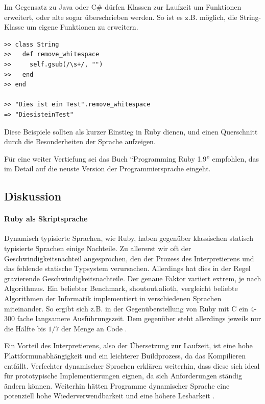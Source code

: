 Im Gegensatz zu Java oder C\# dürfen Klassen zur Laufzeit um Funktionen erweitert, oder alte sogar überschrieben werden. So ist es z.B. möglich, die String-Klasse um eigene Funktionen zu erweitern.

\begin{lstlisting}
>> class String
>>   def remove_whitespace
>>     self.gsub(/\s+/, "")
>>   end
>> end

>> "Dies ist ein Test".remove_whitespace
=> "DiesisteinTest"

\end{lstlisting}

Diese Beispiele sollten als kurzer Einstieg in Ruby dienen, und einen Querschnitt durch die Besonderheiten der Sprache aufzeigen.

Für eine weiter Vertiefung sei das Buch "`Programming Ruby 1.9"' empfohlen, das im Detail auf die neuste Version der Programmiersprache eingeht.

\subsection{Diskussion}

\paragraph{Ruby als Skriptsprache}
Dynamisch typisierte Sprachen, wie Ruby, haben gegenüber klassischen statisch typisierte Sprachen einige Nachteile. Zu allererst wir oft der Geschwindigkeitsnachteil angesprochen, den der Prozess des Interpretierens und das fehlende statische Typsystem verursachen.
Allerdings hat dies in der Regel gravierende Geschwindigkeitsnachteile. Der genaue Faktor variiert extrem, je nach Algorithmus. Ein beliebter Benchmark, shoutout.alioth, vergleicht beliebte Algorithmen der Informatik implementiert in verschiedenen Sprachen miteinander. So ergibt sich z.B. in der Gegenüberstellung von Ruby mit C ein 4-300 fache langsamere Ausführungszeit. Dem gegenüber steht allerdings jeweils nur die Hälfte bis $1/7$ der Menge an Code \citep{computer_language_benchmarks_game_ruby_2011}.

Ein Vorteil des Interpretierens, also der Übersetzung zur Laufzeit, ist eine hohe Plattformunabhängigkeit und ein leichterer Buildprozess, da das Kompilieren entfällt. 
Verfechter dynamischer Sprachen erklären weiterhin, dass diese sich ideal für prototypische Implementierungen eignen, da sich Anforderungen ständig ändern können. Weiterhin hätten Programme dynamischer Sprache eine potenziell hohe Wiederverwendbarkeit und eine höhere Lesbarkeit \citep{meijer_static_2005} \citep{ousterhout_scripting:_1998}.

